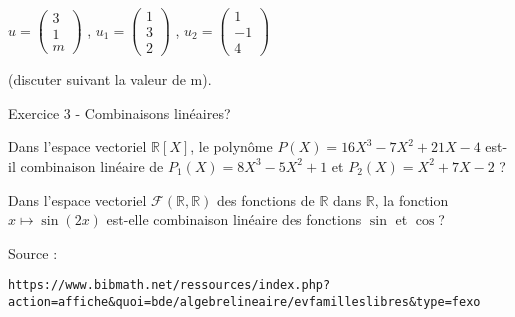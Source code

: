 \vspace{.323cm}
$ u = 
\left( \begin{array}{ c }
 3 \\ 1 \\ m
\end{array} \right)$
,
$ u_1 = 
\left( \begin{array}{ c }
 1 \\ 3 \\ 2
\end{array} \right)$
,
$ u_2 = 
\left( \begin{array}{ c }
 1 \\ −1 \\ 4
\end{array} \right)$

 (discuter suivant la valeur de m). 


\vspace{.323cm}
Exercice 3 - Combinaisons linéaires?

\vspace{.323cm}
 Dans l'espace vectoriel $\mathbb{R}[X]$, le polynôme $P(X)=16X^3−7X^2+21X−4$ est-il combinaison linéaire de $P_1(X)=8X^3−5X^2+1$ et $P_2(X)=X^2+7X−2$ ?

\vspace{.323cm}
Dans l'espace vectoriel $\mathcal{F}(\mathbb{R},\mathbb{R})$
des fonctions de $\mathbb{R}$ dans $\mathbb{R}$, la fonction $x ↦ \sin(2x)$ est-elle combinaison linéaire des fonctions $\sin$ et $\cos$?
\vspace{.323cm}

{\scriptsize Source : 

\texttt{https://www.bibmath.net/ressources/index.php?action=affiche\&quoi=bde/algebrelineaire/evfamilleslibres\&type=fexo}}


